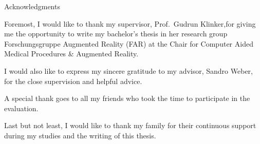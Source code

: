 \clearpage
{}
\thispagestyle{empty}

\vspace*{20mm}

\begin{center}
	{ Acknowledgments}
\end{center}

\vspace{10mm}

Foremost, I would like to thank my supervisor, Prof.\ Gudrun Klinker,for giving me the opportunity to write my bachelor's thesis in her research group Forschungsgruppe Augmented Reality (FAR) at the Chair for Computer Aided Medical Procedures \& Augmented Reality.

I would also like to express my sincere gratitude to my advisor, Sandro Weber, for the close supervision and helpful advice.

A special thank goes to all my friends who took the time to participate in the evaluation.

Last but not least, I would like to thank my family for their continuous support during my studies and the writing of this thesis.

\cleardoublepage{}
